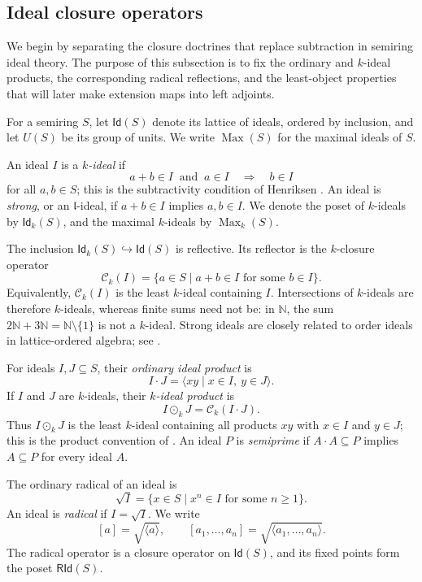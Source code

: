 \documentclass[12pt,leqno]{amsart}
\newcommand{\RId}{\mathsf{RId}}
\newcommand{\Id}{\mathsf{Id}}
\newcommand{\Idk}{\mathsf{Id}_{k}}
\newcommand{\Max}{\operatorname{Max}}
\newcommand{\Maxk}{\operatorname{Max}_{k}}
\theoremstyle{definition}
\numberwithin{equation}{section}
\theoremstyle{remark}
\begin{document}
\subsection{Ideal closure operators}

We begin by separating the closure doctrines that replace subtraction in semiring ideal theory. The purpose of this subsection is to fix the ordinary and $k$-ideal products, the corresponding radical reflections, and the least-object properties that will later make extension maps into left adjoints.

For a semiring $S$, let \(\Id(S)\) denote its lattice of ideals, ordered by inclusion, and let \(U(S)\) be its group of units. We write \(\Max(S)\) for the maximal ideals of $S$.

An ideal $I$ is a \emph{$k$-ideal} if
\[
a+b\in I\ \text{ and }\ a\in I\quad\Longrightarrow\quad b\in I
\]
for all $a,b\in S$; this is the subtractivity condition of Henriksen \cite{Hen58}. An ideal is \emph{strong}, or an \(\mathfrak l\)-ideal, if \(a+b\in I\) implies \(a,b\in I\). We denote the poset of $k$-ideals by \(\Idk(S)\), and the maximal $k$-ideals by \(\Maxk(S)\).

The inclusion \(\Idk(S)\hookrightarrow\Id(S)\) is reflective. Its reflector is the $k$-closure operator
\[
\mathcal C_k(I)
 =\{a\in S\mid a+b\in I\text{ for some }b\in I\}.
\]
Equivalently, \(\mathcal C_k(I)\) is the least $k$-ideal containing $I$. Intersections of $k$-ideals are therefore $k$-ideals, whereas finite sums need not be: in \(\mathds{N}\), the sum \(2\mathds{N}+3\mathds{N}=\mathds{N}\setminus\{1\}\) is not a $k$-ideal. Strong ideals are closely related to order ideals in lattice-ordered algebra; see \cite{Smith}.

For ideals $I,J\subseteq S$, their \emph{ordinary ideal product} is
\[
I\cdot J=\langle xy\mid x\in I,\ y\in J\rangle.
\]
If $I$ and $J$ are $k$-ideals, their \emph{$k$-ideal product} is
\[
I\odot_k J=\mathcal C_k(I\cdot J).
\]
Thus \(I\odot_kJ\) is the least $k$-ideal containing all products $xy$ with $x\in I$ and $y\in J$; this is the product convention of \cite[Section~2]{AG24}. An ideal $P$ is \emph{semiprime} if \(A\cdot A\subseteq P\) implies \(A\subseteq P\) for every ideal $A$.

The ordinary radical of an ideal is
\[
\sqrt I=\{x\in S\mid x^n\in I\text{ for some }n\geq1\}.
\]
An ideal is \emph{radical} if \(I=\sqrt I\). We write
\[
[a]=\sqrt{\langle a\rangle},
\qquad
[a_1,\ldots,a_n]=\sqrt{\langle a_1,\ldots,a_n\rangle}.
\]
The radical operator is a closure operator on \(\Id(S)\), and its fixed points form the poset \(\RId(S)\).
\end{document}
